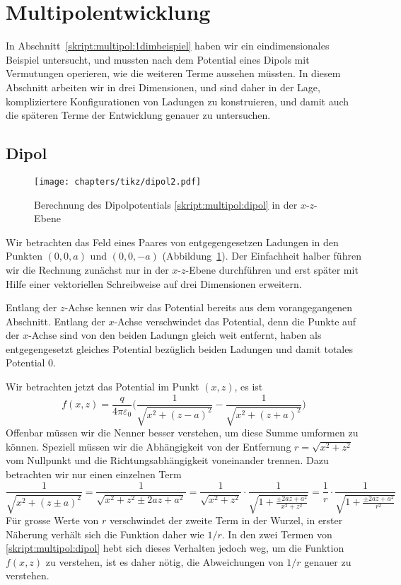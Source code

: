 %
%
%
\section{Multipolentwicklung}
In Abschnitt~\ref{skript:multipol:1dimbeispiel} haben wir ein
eindimensionales Beispiel untersucht, und mussten nach dem Potential
eines Dipols mit Vermutungen operieren, wie die weiteren Terme aussehen
müssten.
In diesem Abschnitt arbeiten wir in drei Dimensionen, und sind daher
in der Lage, kompliziertere Konfigurationen von Ladungen zu
konstruieren, und damit auch die späteren Terme der Entwicklung
genauer zu untersuchen.


\subsection{Dipol}
\begin{figure}
\centering
\texttt{[image: chapters/tikz/dipol2.pdf]}
\caption{Berechnung des Dipolpotentials 
\eqref{skript:multipol:dipol} in der $x$-$z$-Ebene
\label{skript:multipol:figure:dipol}}
\end{figure}
Wir betrachten das Feld eines Paares von entgegengesetzen Ladungen
in den Punkten $(0,0,a)$ und $(0,0,-a)$
(Abbildung~\ref{skript:multipol:figure:dipol}).
Der Einfachheit halber führen wir die Rechnung zunächst nur
in der $x$-$z$-Ebene durchführen und erst später mit Hilfe einer
vektoriellen Schreibweise auf drei Dimensionen erweitern.

Entlang der $z$-Achse kennen wir das Potential bereits aus
dem vorangegangenen Abschnitt.
Entlang der $x$-Achse verschwindet das Potential, denn die Punkte
auf der $x$-Achse sind von den beiden Ladungn gleich weit entfernt,
haben als entgegengesetzt gleiches Potential bezüglich beiden Ladungen
und damit totales Potential 0.

Wir betrachten jetzt das Potential im Punkt $(x,z)$, es ist
\begin{equation}
f(x,z)
=
\frac{q}{4\pi\varepsilon_0}
\biggl(
\frac{1}{\sqrt{x^2 + (z-a)^2}}
-
\frac{1}{\sqrt{x^2 + (z+a)^2}}
\biggr)
\label{skript:multipol:dipol}
\end{equation}
Offenbar müssen wir die Nenner besser verstehen, um diese Summe 
umformen zu können.
Speziell müssen wir die Abhängigkeit von der Entfernung
$r=\sqrt{x^2+z^2}$ vom Nullpunkt
und die Richtungsabhängigkeit voneinander trennen.
Dazu betrachten wir nur einen einzelnen Term
\[
\frac{1}{\sqrt{x^2+(z\pm a)^2}}
=
\frac{1}{\sqrt{x^2+z^2\pm 2az+a^2}}
=
\frac{1}{\sqrt{x^2+z^2}} \cdot \frac{1}{\sqrt{1+\frac{\pm 2az+a^2}{x^2+z^2}}}
=
\frac{1}{r} \cdot \frac{1}{\sqrt{1+\frac{\pm 2az+a^2}{r^2}}}
\]
Für grosse Werte von $r$ verschwindet der zweite Term in der Wurzel,
in erster Näherung verhält sich die Funktion daher wie $1/r$.
In den zwei Termen von \eqref{skript:multipol:dipol} hebt sich dieses
Verhalten jedoch weg, um die Funktion $f(x,z)$ zu verstehen, ist es
daher nötig, die Abweichungen von $1/r$ genauer zu verstehen.

